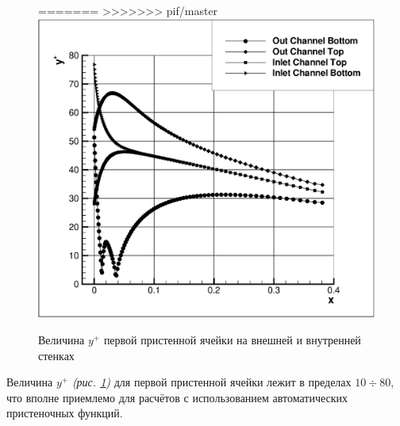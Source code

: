 \begin{figure}[h]
	\centering
=======
>>>>>>> pif/master
	\includegraphics[scale=0.4]{uDuctyplus}
	\caption{Величина $y^{+}$ первой пристенной ячейки на внешней и внутренней стенках}
	\label{fig:uDuctyplus}
\end{figure}
\clearpage

Величина $y^{+}$ \textit{(рис. \ref{fig:uDuctyplus})} для первой пристенной ячейки лежит в пределах $10 \div 80$, что вполне приемлемо для расчётов с использованием автоматических пристеночных функций.

